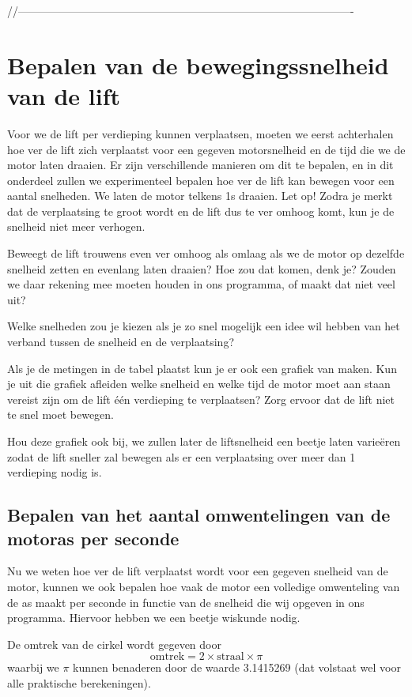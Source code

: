 \documentclass[a4paper, 10pt]{article}
\begin{document}
//-------------------------------------------------------------------------------------------
\section{Bepalen van de bewegingssnelheid van de lift}

Voor we de lift per verdieping kunnen verplaatsen, moeten we eerst achterhalen hoe ver de lift zich verplaatst voor
een gegeven motorsnelheid en de tijd die we de motor laten draaien. Er zijn verschillende manieren om dit te bepalen,
en in dit onderdeel zullen we experimenteel bepalen hoe ver de lift kan bewegen voor een aantal snelheden. We laten
de motor telkens 1s draaien. Let op! Zodra je merkt dat de verplaatsing te groot wordt en de lift dus te ver omhoog
komt, kun je de snelheid niet meer verhogen.

Beweegt de lift trouwens even ver omhoog als omlaag als we de motor op
dezelfde snelheid zetten en evenlang laten draaien? Hoe zou dat komen, denk je? Zouden we daar rekening mee moeten houden
in ons programma, of maakt dat niet veel uit?

Welke snelheden zou je kiezen als je zo snel mogelijk een idee wil hebben van het verband tussen de snelheid
en de verplaatsing?

Als je de metingen in de tabel plaatst kun je er ook een grafiek van maken. Kun je uit die grafiek afleiden welke
snelheid en welke tijd de motor moet aan staan  vereist zijn om de lift \'e\'en verdieping te verplaatsen?
Zorg ervoor dat de lift niet te snel moet bewegen.

Hou deze grafiek ook bij, we zullen later de liftsnelheid een beetje laten varie\"eren zodat de lift sneller zal
bewegen als er een verplaatsing over meer dan 1 verdieping nodig is.

\subsection{Bepalen van het aantal omwentelingen van de motoras per seconde}

Nu we weten hoe ver de lift verplaatst wordt voor een gegeven snelheid van de motor, kunnen we ook bepalen
hoe vaak de motor een volledige omwenteling van de as maakt per seconde in functie van de snelheid die wij
opgeven in ons programma. Hiervoor hebben we een beetje wiskunde nodig.

De omtrek van de cirkel wordt gegeven door
\begin{equation}
\mathrm{omtrek} = 2 \times \mathrm{straal} \times \pi
\end{equation}
waarbij we $\pi$ kunnen benaderen door de waarde 3.1415269 (dat volstaat wel voor alle praktische berekeningen).
\end{document}
